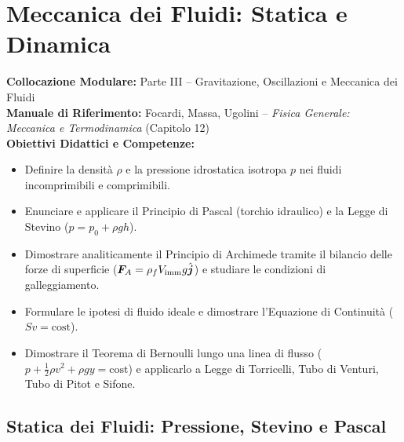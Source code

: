 \chapter{Meccanica dei Fluidi: Statica e Dinamica}
\label{chap:meccanica_fluidi}

\begin{tcolorbox}[enhanced, breakable, colback=navyblue!4!white, colframe=navyblue!80!black,
    coltitle=white, fonttitle=\bfseries\sffamily, title={Quadro Sinottico del Capitolo 11},
    sharp corners, rounded corners=south, boxrule=1pt]
\textbf{Collocazione Modulare:} Parte III -- Gravitazione, Oscillazioni e Meccanica dei Fluidi\\
\textbf{Manuale di Riferimento:} Focardi, Massa, Ugolini -- \emph{Fisica Generale: Meccanica e Termodinamica} (Capitolo 12)\\
\textbf{Obiettivi Didattici e Competenze:}\par
\begin{itemize}
    \item Definire la densità $\rho$ e la pressione idrostatica isotropa $p$ nei fluidi incomprimibili e comprimibili.
    \item Enunciare e applicare il Principio di Pascal (torchio idraulico) e la Legge di Stevino ($p = p_0 + \rho g h$).
    \item Dimostrare analiticamente il Principio di Archimede tramite il bilancio delle forze di superficie ($\bm{F}_A = \rho_f V_{\text{imm}} g\hat{\bm{j}}$) e studiare le condizioni di galleggiamento.
    \item Formulare le ipotesi di fluido ideale e dimostrare l'Equazione di Continuità ($S v = \text{cost}$).
    \item Dimostrare il Teorema di Bernoulli lungo una linea di flusso ($p + \frac{1}{2}\rho v^2 + \rho gy = \text{cost}$) e applicarlo a Legge di Torricelli, Tubo di Venturi, Tubo di Pitot e Sifone.
\end{itemize}
\end{tcolorbox}

\vspace{0.5em}

\section{Statica dei Fluidi: Pressione, Stevino e Pascal}
\label{sec:statica_fluidi}

